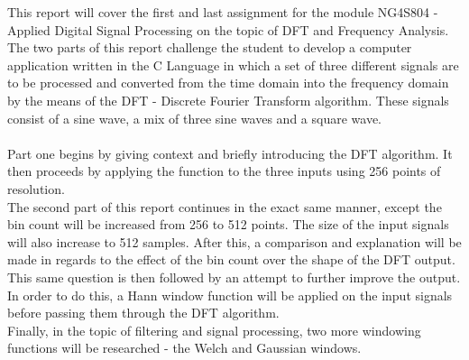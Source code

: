 This report will cover the first and last assignment for the module NG4S804 - Applied Digital Signal Processing on the topic of DFT and Frequency Analysis.\\

The two parts of this report challenge the student to develop a computer application written in the C Language in which a set of three different signals are to be processed and converted from the time domain into the frequency domain by the means of the DFT - Discrete Fourier Transform algorithm. These signals consist of a sine wave, a mix of three sine waves and a square wave.

\paragraph{}
Part one begins by giving context and briefly introducing the DFT algorithm. It then proceeds by applying the function to the three inputs using 256 points of resolution.\\

The second part of this report continues in the exact same manner, except the bin count will be increased from 256 to 512 points. The size of the input signals will also increase to 512 samples.
After this, a comparison and explanation will be made in regards to the effect of the bin count over the shape of the DFT output.\\

This same question is then followed by an attempt to further improve the output. In order to do this, a Hann window function will be applied on the input signals before passing them through the DFT algorithm.\\

Finally, in the topic of filtering and signal processing, two more windowing functions will be researched - the Welch and Gaussian windows.